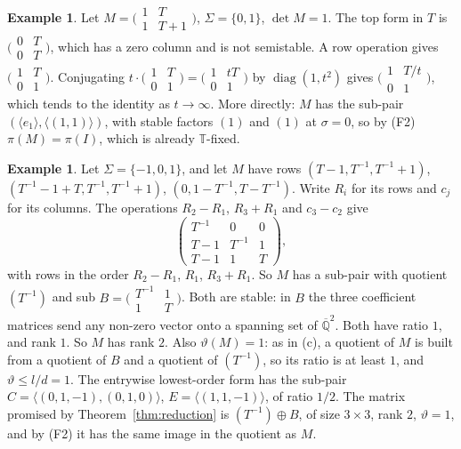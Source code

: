 \documentclass[11pt,a4paper]{article}
\theoremstyle{plain}
\theoremstyle{definition}
\newtheorem{example}[lemma]{Example}
\newcommand{\Qbar}{\overline{\mathbb{Q}}}
\newcommand{\Tor}{\mathbb{T}}
\newcommand{\vth}{\vartheta}
\begin{document}
\begin{example}
Let $M=\bigl(\begin{smallmatrix}1&T\\1&T+1\end{smallmatrix}\bigr)$, $\Sigma=\{0,1\}$, $\det M=1$. The top form in $T$ is $\bigl(\begin{smallmatrix}0&T\\0&T\end{smallmatrix}\bigr)$, which has a zero column and is not semistable. A row
operation gives $\bigl(\begin{smallmatrix}1&T\\0&1\end{smallmatrix}\bigr)$. Conjugating $t\cdot\bigl(\begin{smallmatrix}1&T\\0&1\end{smallmatrix}\bigr)=\bigl(\begin{smallmatrix}1&tT\\0&1\end{smallmatrix}\bigr)$ by $\operatorname{diag}(1,t^{2})$ gives
$\bigl(\begin{smallmatrix}1&T/t\\0&1\end{smallmatrix}\bigr)$, which tends to the identity as $t\to\infty$. More directly: $M$ has the sub-pair $(\langle e_{1}\rangle,\langle(1,1)\rangle)$, with stable factors $(1)$ and $(1)$ at $\sigma=0$, so by (F2) $\pi(M)=\pi(I)$, which is
already $\Tor$-fixed.
\end{example}

\begin{example}
Let $\Sigma=\{-1,0,1\}$, and let $M$ have rows $(T-1,T^{-1},T^{-1}+1)$, $(T^{-1}-1+T,T^{-1},T^{-1}+1)$, $(0,1-T^{-1},T-T^{-1})$. Write $R_{i}$ for its rows and $c_{j}$ for its columns. The operations $R_{2}-R_{1}$, $R_{3}+R_{1}$ and $c_{3}-c_{2}$ give
\[
\begin{pmatrix}T^{-1}&0&0\\T-1&T^{-1}&1\\T-1&1&T\end{pmatrix},
\]
with rows in the order $R_{2}-R_{1}$, $R_{1}$, $R_{3}+R_{1}$. So $M$ has a sub-pair with quotient $(T^{-1})$ and sub $B=\bigl(\begin{smallmatrix}T^{-1}&1\\1&T\end{smallmatrix}\bigr)$. Both are stable: in $B$ the three coefficient matrices send any non-zero vector onto a spanning set of $\Qbar^{2}$. Both have ratio $1$, and rank $1$. So $M$ has rank $2$. Also $\vth(M)=1$: as in (c), a quotient of $M$ is built from a quotient of $B$ and a quotient of $(T^{-1})$, so its ratio is at least $1$, and $\vth\le l/d=1$. The entrywise lowest-order form has the sub-pair $C=\langle(0,1,-1),(0,1,0)\rangle$, $E=\langle(1,1,-1)\rangle$, of ratio $1/2$. The matrix promised by Theorem~\ref{thm:reduction} is
$(T^{-1})\oplus B$, of size $3\times3$, rank $2$, $\vth=1$, and by (F2) it has the same image in the quotient as $M$.
\end{example}
\end{document}
